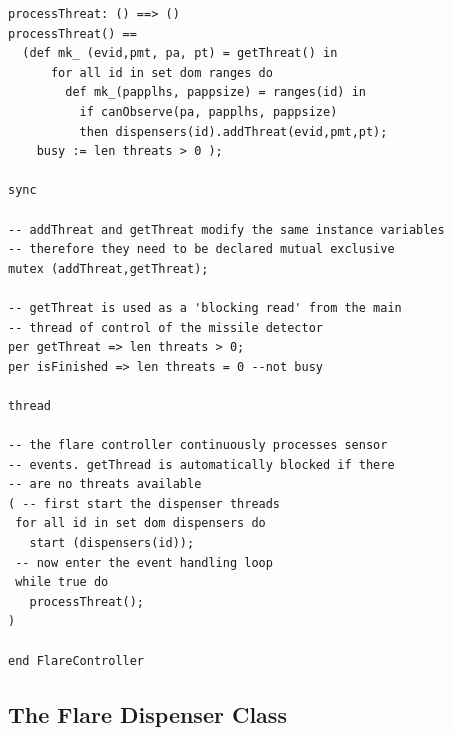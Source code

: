 \documentclass{overturerepchap}
\begin{document}
\begin{lstlisting}
processThreat: () ==> ()
processThreat() ==
  (def mk_ (evid,pmt, pa, pt) = getThreat() in
      for all id in set dom ranges do
        def mk_(papplhs, pappsize) = ranges(id) in
          if canObserve(pa, papplhs, pappsize)
          then dispensers(id).addThreat(evid,pmt,pt);
    busy := len threats > 0 );

sync

-- addThreat and getThreat modify the same instance variables
-- therefore they need to be declared mutual exclusive
mutex (addThreat,getThreat);

-- getThreat is used as a 'blocking read' from the main
-- thread of control of the missile detector
per getThreat => len threats > 0;
per isFinished => len threats = 0 --not busy

thread

-- the flare controller continuously processes sensor
-- events. getThread is automatically blocked if there
-- are no threats available
( -- first start the dispenser threads
 for all id in set dom dispensers do
   start (dispensers(id));
 -- now enter the event handling loop
 while true do
   processThreat();
)

end FlareController
\end{lstlisting}

\subsection{The Flare Dispenser Class}
\end{document}
